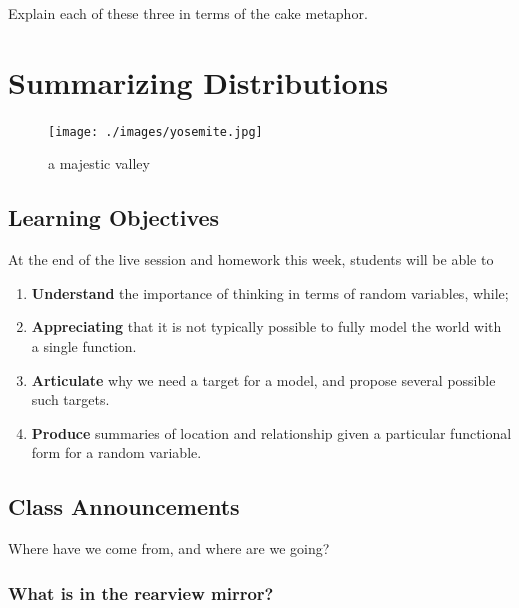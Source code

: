 \documentclass[
]{book}
\providecommand{\tightlist}{%
  \setlength{\itemsep}{0pt}\setlength{\parskip}{0pt}}
\theoremstyle{definition}
\theoremstyle{definition}
\theoremstyle{definition}
\theoremstyle{definition}
\theoremstyle{remark}
\begin{document}
Explain each of these three in terms of the cake metaphor.

\hypertarget{summarizing-distributions}{%
\chapter{Summarizing Distributions}\label{summarizing-distributions}}

\begin{figure}
\centering
\texttt{[image: ./images/yosemite.jpg]}
\caption{a majestic valley}
\end{figure}

\hypertarget{learning-objectives-2}{%
\section{Learning Objectives}\label{learning-objectives-2}}

At the end of the live session and homework this week, students will be able to

\begin{enumerate}
\def\labelenumi{\arabic{enumi}.}
\tightlist
\item
  \textbf{Understand} the importance of thinking in terms of random variables, while;
\item
  \textbf{Appreciating} that it is not typically possible to fully model the world with a single function.
\item
  \textbf{Articulate} why we need a target for a model, and propose several possible such targets.
\item
  \textbf{Produce} summaries of location and relationship given a particular functional form for a random variable.
\end{enumerate}

\hypertarget{class-announcements-1}{%
\section{Class Announcements}\label{class-announcements-1}}

Where have we come from, and where are we going?

\hypertarget{what-is-in-the-rearview-mirror}{%
\subsection{What is in the rearview mirror?}\label{what-is-in-the-rearview-mirror}}
\end{document}
